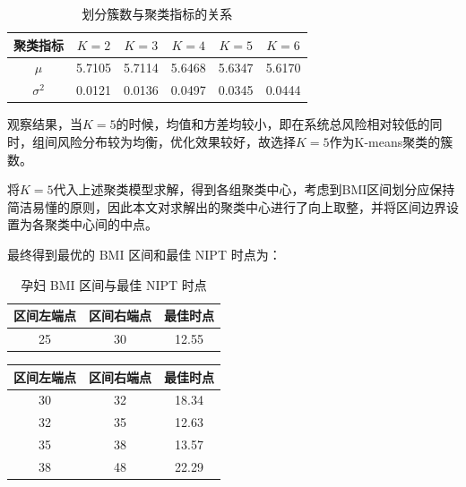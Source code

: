 \documentclass[12pt]{ctexart}
\begin{document}
	\begin{table}[htbp]
		\centering
		\caption{划分簇数与聚类指标的关系}
		\begin{threeparttable}
			\setlength{\tabcolsep}{6pt} %
			\small %
			\begin{tabular}{ c *{5}{c} } %
				\toprule
				聚类指标 & $K = 2$ & $K = 3$ & $K = 4$ & $K = 5$ & $K = 6$ \\
				\midrule
				$\mu$    & 5.7105 & 5.7114 & 5.6468 & 5.6347 & 5.6170 \\
				$\sigma^2$ & 0.0121 & 0.0136 & 0.0497 & 0.0345 & 0.0444 \\
				\bottomrule
			\end{tabular}
		\end{threeparttable}
	\end{table}

	观察结果，当$K=5$的时候，均值和方差均较小，即在系统总风险相对较低的同时，组间风险分布较为均衡，优化效果较好，故选择$K=5$作为K-means聚类的簇数。
	
	将$K=5$代入上述聚类模型求解，得到各组聚类中心，考虑到BMI区间划分应保持简洁易懂的原则，因此本文对求解出的聚类中心进行了向上取整，并将区间边界设置为各聚类中心间的中点。
	
	最终得到最优的 BMI 区间和最佳 NIPT 时点为：
\begin{table}[H]
	\centering
		\caption{孕妇 BMI 区间与最佳 NIPT 时点}
	\begin{threeparttable}
		\setlength{\tabcolsep}{14pt} %
		\begin{tabular}{ccc}
			\toprule
		区间左端点& 区间右端点& 最佳时点\\
			\midrule
			25 & 30 & 12.55 \\
			\bottomrule
		\end{tabular}
	\end{threeparttable}

\end{table}

\begin{table}[htbp]
	\centering
	\begin{threeparttable}
		\setlength{\tabcolsep}{14pt} %
		\begin{tabular}{ccc}
			\toprule
			区间左端点& 区间右端点& 最佳时点\\
			\midrule
						30 & 32 & 18.34 \\
			32 & 35 & 12.63 \\
			35 & 38 & 13.57 \\
			38 & 48 & 22.29 \\
			\bottomrule
		\end{tabular}
	\end{threeparttable}
	
\end{table}
\end{document}
